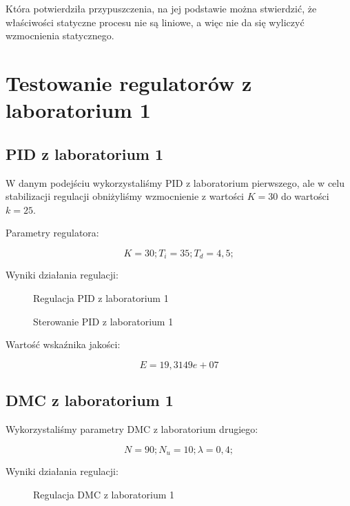 Która potwierdziła przypuszczenia, na jej podstawie można stwierdzić, że właściwości statyczne procesu nie są liniowe, a więc nie da się wyliczyć wzmocnienia statycznego.

\section{Testowanie regulatorów z laboratorium 1}

\subsection{PID z laboratorium 1}

W danym podejściu wykorzystaliśmy PID z laboratorium pierwszego, ale w celu stabilizacji regulacji obniżyliśmy wzmocnienie z wartości $K = 30$ do wartości $k = 25$.

Parametry regulatora:

\begin{equation}
K = 30; 
T_i = 35; 
T_d = 4,5; 
\end{equation}

Wyniki działania regulacji:

\begin{figure}[H]
\centering

\caption{Regulacja PID z laboratorium 1}
\end{figure}

\begin{figure}[H]
\centering

\caption{Sterowanie PID z laboratorium 1}
\end{figure}

Wartość wskaźnika jakości:

\begin{equation}
E = 19,3149e+07
\end{equation}

\subsection{DMC z laboratorium 1}

Wykorzystaliśmy parametry DMC z laboratorium drugiego:

\begin{equation}
N = 90; 
N_u = 10; 
\lambda = 0,4; 
\end{equation}
 
Wyniki działania regulacji:

\begin{figure}[H]
\centering

\caption{Regulacja DMC z laboratorium 1}
\end{figure}

